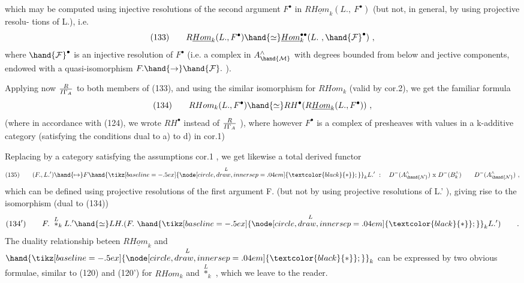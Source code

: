 
which may be computed using injective resolutions of the second argument
$F^\bullet$ in $R\underline{Hom}_k(L.,\ F^\bullet)$ (but not, in general, by using projective resolu-%
tions of L.), i.e.
\[ (133) \qquad R\underline{Hom}_k(L.,F^\bullet) \hand{\simeq} \underline{Hom}_k^{\bullet\bullet}(L.\ ,\hand{\mathcal{F}}^\bullet) \ , \]
where $\hand{\mathcal{F}}^\bullet$ is an injective resolution of $F^\bullet$ (i.e. a complex in $A^\wedge_{\hand{\mathcal{M}}}$ with
degrees bounded from below and jective components, endowed with a
quasi-isomorphism $F.\hand{\to}\hand{\mathcal{F}}.$ ).

Applying now $R\over{I}{\Gamma}_A$ to both members of (133), and using the similar
isomorphism for $RHom_k$ (valid by cor.2), we get the familiar formula
\[ (134) \qquad RHom_k(L.,F^\bullet) \hand{\simeq} RH^\bullet(R\underline{Hom}_k(L.,F^\bullet)) \ , \]
(where in accordance with (124), we wrote $RH^\bullet$ instead of $R\over{I}{\Gamma}_A$ ), where
however $F^\bullet$ is  a complex of  presheaves with values in a
k-additive category  (satisfying the conditions dual to a) to d) in
cor.1)

Replacing  by a category  satisfying the assumptions   cor.1 ,
we get likewise a total  derived functor
\[ (135) \qquad (F.,L.')\hand{\mapsto} F \overset{L}{\hand{\mathbin{\tikz[baseline=-.5ex]{\node[circle,draw,inner sep=.04em] {\ensuremath{\textcolor{black}{*}}};}}}}_k L.' \ : \quad D^-(A^\wedge_{\hand{\mathcal{N}}}) \text{ x } D^-(B^\wedge_k) \qquad D^-(A^\wedge_{\hand{\mathcal{N}}}) \ , \]
which can be defined  using projective resolutions of the first argument
F. (but not by using projective resolutions of L.' ), giving rise to
the isomorphism (dual to (134))
\[ (134') \qquad F.\ \overset{L}{\ast}_k L.' \hand{\simeq} LH.(F.\ \overset{L}{\hand{\mathbin{\tikz[baseline=-.5ex]{\node[circle,draw,inner sep=.04em] {\ensuremath{\textcolor{black}{*}}};}}}}_k L.') \qquad . \]
The duality relationship beteen $R\underline{Hom}_k$ and $\overset{L}{\hand{\mathbin{\tikz[baseline=-.5ex]{\node[circle,draw,inner sep=.04em] {\ensuremath{\textcolor{black}{*}}};}}}}_k$ can be expressed by
two obvious formulae, similar to (120) and (120') for $RHom_k$ and $\overset{L}{\ast}_k$ ,
which we leave to the reader.

